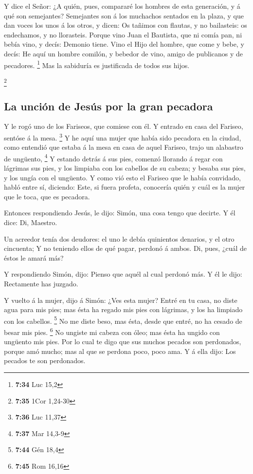  Y dice el Señor: ¿A quién, pues, compararé los hombres de
esta generación, y á qué son semejantes?  Semejantes son á
los muchachos sentados en la plaza, y que dan voces los unos á los
otros, y dicen: Os tañimos con flautas, y no bailasteis: os endechamos,
y no llorasteis.  Porque vino Juan el Bautista, que ni
comía pan, ni bebía vino, y decís: Demonio tiene.  Vino el
Hijo del hombre, que come y bebe, y decís: He aquí un hombre comilón, y
bebedor de vino, amigo de publicanos y de pecadores. \footnote{\textbf{7:34}
  Luc 15,2}  Mas la sabiduría es justificada de todos sus
hijos.

\footnote{\textbf{7:35} 1Cor 1,24-30}

\hypertarget{la-unciuxf3n-de-jesuxfas-por-la-gran-pecadora}{%
\subsection{La unción de Jesús por la gran
pecadora}\label{la-unciuxf3n-de-jesuxfas-por-la-gran-pecadora}}

 Y le rogó uno de los Fariseos, que comiese con él. Y
entrado en casa del Fariseo, sentóse á la mesa. \footnote{\textbf{7:36}
  Luc 11,37}  Y he aquí una mujer que había sido pecadora
en la ciudad, como entendió que estaba á la mesa en casa de aquel
Fariseo, trajo un alabastro de ungüento, \footnote{\textbf{7:37} Mar
  14,3-9}  Y estando detrás á sus pies, comenzó llorando á
regar con lágrimas sus pies, y los limpiaba con los cabellos de su
cabeza; y besaba sus pies, y los ungía con el ungüento.  Y
como vió esto el Fariseo que le había convidado, habló entre sí,
diciendo: Este, si fuera profeta, conocería quién y cuál es la mujer que
le toca, que es pecadora.

 Entonces respondiendo Jesús, le dijo: Simón, una cosa
tengo que decirte. Y él dice: Di, Maestro.

 Un acreedor tenía dos deudores: el uno le debía quinientos
denarios, y el otro cincuenta;  Y no teniendo ellos de qué
pagar, perdonó á ambos. Di, pues, ¿cuál de éstos le amará más?

 Y respondiendo Simón, dijo: Pienso que aquél al cual
perdonó más. Y él le dijo: Rectamente has juzgado.

 Y vuelto á la mujer, dijo á Simón: ¿Ves esta mujer? Entré
en tu casa, no diste agua para mis pies; mas ésta ha regado mis pies con
lágrimas, y los ha limpiado con los cabellos. \footnote{\textbf{7:44}
  Gén 18,4}  No me diste beso, mas ésta, desde que entré,
no ha cesado de besar mis pies. \footnote{\textbf{7:45} Rom 16,16}
 No ungiste mi cabeza con óleo; mas ésta ha ungido con
ungüento mis pies.  Por lo cual te digo que sus muchos
pecados son perdonados, porque amó mucho; mas al que se perdona poco,
poco ama.  Y á ella dijo: Los pecados te son perdonados.

